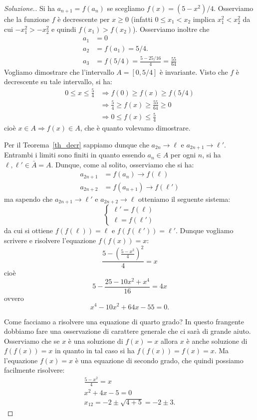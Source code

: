 \documentclass[italian,a4paper]{scrartcl}
\begin{document}
\begin{proof}[Soluzione.]
Si ha $a_{n+1} = f(a_n)$ se scegliamo $f(x) = (5-x^2)/4$. Osserviamo
che la funzione $f$ è decrescente per $x \ge 0$ (infatti $0 \le x_1 <
x_2$ implica $x_1^2 < x_2^2$ da cui $-x_1^2 > -x_2^2$ e quindi $f(x_1)
> f(x_2)$). Osserviamo inoltre che
\begin{align*}
a_1 &= 0\\
a_2 &= f(a_1) = 5/4.\\
a_3 &= f(5/4) = \frac{5-25/16}{4} = \frac{55}{64}
\end{align*}
Vogliamo dimostrare che l'intervallo $A=[0,5/4]$ è invariante. Visto
che $f$ è decrescente su tale intervallo, si ha:
\begin{align*}
0 \le x \le \frac 5 4 &\Rightarrow f(0) \ge f(x) \ge f(5/4)\\
&\Rightarrow \frac 5 4 \ge f(x) \ge \frac{55}{64} \ge 0\\
&\Rightarrow 0 \le f(x) \le \frac 5 4
\end{align*}
cioè $x\in A \Rightarrow f(x)\in A$, che è quanto volevamo dimostrare.

Per il Teorema~\ref{th_decr} sappiamo dunque che $a_{2n} \to \ell$ e
$a_{2n+1} \to \ell'$. Entrambi i limiti sono finiti in quanto essendo
$a_n \in A$ per ogni $n$, si ha $\ell, \ell' \in \bar A = A$.
Dunque, come al solito, osserviamo che si ha:
\begin{align*}
  a_{2n+1} &= f(a_n) \to f(\ell)  \\
  a_{2n+2} &= f(a_{n+1}) \to f(\ell')
\end{align*}
ma sapendo che $a_{2n+1}\to \ell'$ e $a_{2n+2}\to \ell$ otteniamo il
seguente sistema:
\[
\begin{cases}
  \ell' = f(\ell)\\
  \ell = f(\ell')
\end{cases}
\]
da cui si ottiene $f(f(\ell))=\ell$ e $f(f(\ell'))=\ell'$. Dunque
vogliamo scrivere e risolvere l'equazione $f(f(x))=x$:
\[
\frac{5-\left(\frac{5-x^2}{4}\right)^2}{4} = x
\]
cioè
\[
5 - \frac{25 - 10x^2 + x^4}{16} = 4x
\]
ovvero
\[
x^4 - 10 x^2 + 64 x - 55 = 0.
\]

Come facciamo a risolvere una equazione di quarto grado?
In questo frangente dobbiamo fare una osservazione di carattere
generale che ci sarà di grande aiuto.
Osserviamo che se $x$ è una soluzione di $f(x)=x$ allora $x$
è anche soluzione di $f(f(x)) = x$ in quanto in tal caso si ha
$f(f(x))=f(x)=x$.
Ma l'equazione $f(x) = x$ è una equazione di secondo grado, che quindi
possiamo facilmente risolvere:
\begin{gather*}
  \frac{5-x^2}{4} = x \\
  x^2 + 4x - 5 = 0 \\
  x_{12} = -2 \pm \sqrt{4 + 5} = -2 \pm 3.
\end{gather*}


\end{proof}
\end{document}
